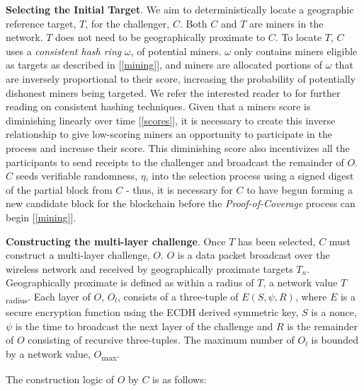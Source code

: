 \documentclass[UTF8, 10pt, nonatbib, nocopyrightspace, reprint]{sigplanconf}
\newcommand{\secref}[1]{[\autoref{#1}]}
\begin{document}
\textbf{Selecting the Initial Target}. We aim to deterministically locate a geographic reference target, $T$, for the challenger, $C$. Both $C$ and $T$ are miners in the network. $T$ does not need to be geographically proximate to $C$. To locate $T$, $C$ uses a \emph{consistent hash ring} $\omega$, of potential miners. $\omega$ only contains miners eligible as targets as described in \secref{mining}, and miners are allocated portions of $\omega$ that are inversely proportional to their score, increasing the probability of potentially dishonest miners being targeted. We refer the interested reader to \cite{hashing} for further reading on consistent hashing techniques. Given that a miners score is diminishing linearly over time \secref{scores}, it is necessary to create this inverse relationship to give low-scoring miners an opportunity to participate in the process and increase their score. This diminishing score also incentivizes all the participants to send receipts to the challenger and broadcast the remainder of $O$. $C$ seeds verifiable randomness, $\eta$, into the selection process using a signed digest of the partial block from $C$ - thus, it is necessary for $C$ to have begun forming a new candidate block for the blockchain before the \emph{Proof-of-Coverage} process can begin \secref{mining}.

\textbf{Constructing the multi-layer challenge}. Once $T$ has been selected, $C$ must construct a multi-layer challenge, $O$. $O$ is a data packet broadcast over the wireless network and received by geographically proximate targets $T_n$. Geographically proximate is defined as within a radius of $T$, a network value $T$\textsubscript{radius}. Each layer of $O$, $O_l$, consists of a three-tuple of $E\left(S, \psi, R\right)$, where $E$ is a secure encryption function using the ECDH derived symmetric key, $S$ is a nonce, $\psi$ is the time to broadcast the next layer of the challenge and $R$ is the remainder of $O$ consisting of recursive three-tuples. The maximum number of $O_l$ is bounded by a network value, $O$\textsubscript{max}.

The construction logic of $O$ by $C$ is as follows:
\end{document}
